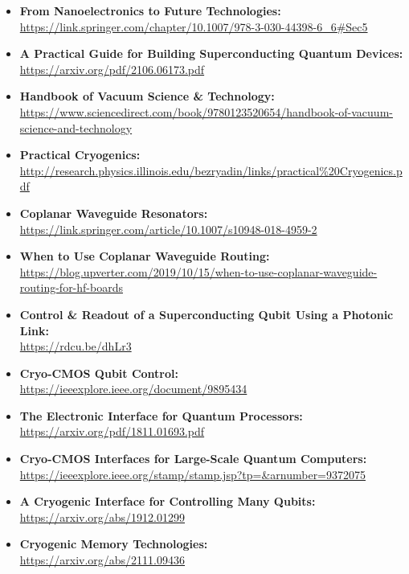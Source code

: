 \begin{itemize}
  \item\textbf{From Nanoelectronics to Future Technologies:}\\
\url{https://link.springer.com/chapter/10.1007/978-3-030-44398-6_6#Sec5}

  \item\textbf{A Practical Guide for Building Superconducting Quantum Devices:}\\
\url{https://arxiv.org/pdf/2106.06173.pdf}

  \item\textbf{Handbook of Vacuum Science \& Technology:}\\
\url{https://www.sciencedirect.com/book/9780123520654/handbook-of-vacuum-science-and-technology}

  \item\textbf{Practical Cryogenics:}\\
\url{http://research.physics.illinois.edu/bezryadin/links/practical%20Cryogenics.pdf}

  \item\textbf{Coplanar Waveguide Resonators:}\\
\url{https://link.springer.com/article/10.1007/s10948-018-4959-2}

  \item\textbf{When to Use Coplanar Waveguide Routing:}\\
\url{https://blog.upverter.com/2019/10/15/when-to-use-coplanar-waveguide-routing-for-hf-boards}

  \item\textbf{Control \& Readout of a Superconducting Qubit Using a Photonic Link:}\\
\url{https://rdcu.be/dhLr3}

  \item\textbf{Cryo-CMOS Qubit Control:}\\
\url{https://ieeexplore.ieee.org/document/9895434}

  \item\textbf{The Electronic Interface for Quantum Processors:}\\
\url{https://arxiv.org/pdf/1811.01693.pdf}

  \item\textbf{Cryo-CMOS Interfaces for Large-Scale Quantum Computers:}\\
\url{https://ieeexplore.ieee.org/stamp/stamp.jsp?tp=&arnumber=9372075}

  \item\textbf{A Cryogenic Interface for Controlling Many Qubits:}\\
\url{https://arxiv.org/abs/1912.01299}

  \item\textbf{Cryogenic Memory Technologies:}\\
\url{https://arxiv.org/abs/2111.09436}

\end{itemize}

